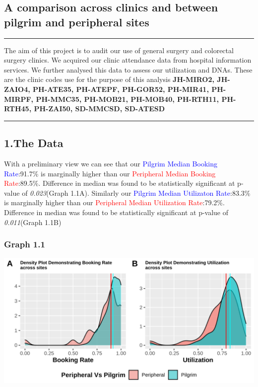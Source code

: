 \documentclass[]{article}
\author{}
\date{\vspace{-2.5em}}
\begin{document}
{
\setcounter{tocdepth}{2}
\tableofcontents
}
\hypertarget{a-comparison-across-clinics-and-between-pilgrim-and-peripheral-sites}{%
\subsection{A comparison across clinics and between pilgrim and
peripheral
sites}\label{a-comparison-across-clinics-and-between-pilgrim-and-peripheral-sites}}

\begin{center}\rule{0.5\linewidth}{0.5pt}\end{center}

The aim of this project is to audit our use of general surgery and
colorectal surgery clinics. We acquired our clinic attendance data from
hospital information services. We further analysed this data to assess
our utilization and DNAs. These are the clinic codes use for the purpose
of this analysis \textbf{JH-MIRO2, JH-ZAIO4, PH-ATE35, PH-ATEPF,
PH-GOR52, PH-MIR41, PH-MIRPF, PH-MMC35, PH-MOB21, PH-MOB40, PH-RTH11,
PH-RTH45, PH-ZAI50, SD-MMCSD, SD-ATESD}

\begin{center}\rule{0.5\linewidth}{0.5pt}\end{center}

\hypertarget{the-data}{%
\subsection{1.The Data}\label{the-data}}

With a preliminary view we can see that our \textcolor{blue}{Pilgrim
Median Booking Rate}:91.7\% is marginally higher than our
\textcolor{red}{Peripheral Median Booking Rate}:89.5\%. Difference in
median was found to be statistically significant at p-value of
\emph{0.023}(Graph 1.1A). Similarly our \textcolor{blue}{Pilgrim Median
Utilizaton Rate}:83.3\% is marginally higher than our
\textcolor{red}{Peripheral Median Utilization Rate}:79.2\%. Difference
in median was found to be statistically significant at p-value of
\emph{0.011}(Graph 1.1B)

\hypertarget{graph-1.1}{%
\subsubsection{Graph 1.1}\label{graph-1.1}}

\begin{center}\includegraphics{LF2_files/figure-latex/unnamed-chunk-3-1} \end{center}
\end{document}
